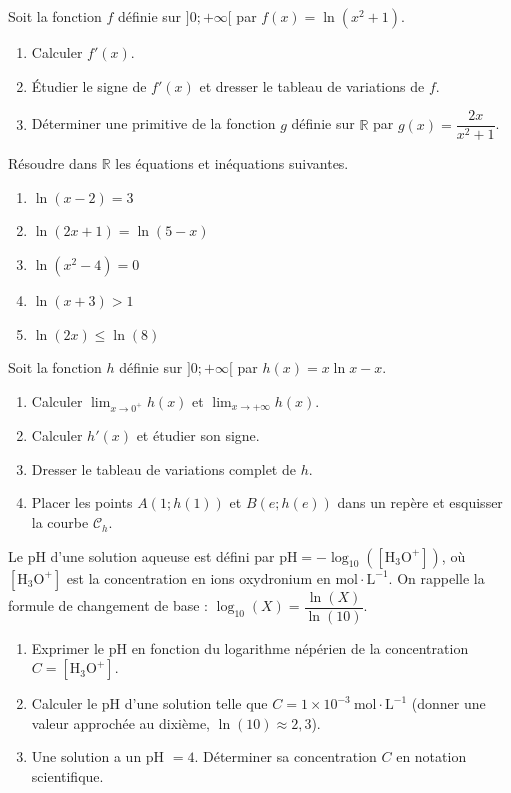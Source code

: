 \documentclass[11pt]{article}
\begin{document}
\begin{exercice}
Soit la fonction $f$ définie sur $]0; +\infty[$ par $f(x) = \ln(x^2 + 1)$.
\begin{enumerate}
    \item Calculer $f'(x)$.
    \item Étudier le signe de $f'(x)$ et dresser le tableau de variations de $f$.
    \item Déterminer une primitive de la fonction $g$ définie sur $\mathbb{R}$ par $g(x) = \dfrac{2x}{x^2+1}$.
\end{enumerate}
\end{exercice}

\begin{exercice}
Résoudre dans $\mathbb{R}$ les équations et inéquations suivantes.
\begin{enumerate}
    \item $\ln(x-2) = 3$
    \item $\ln(2x+1) = \ln(5-x)$
    \item $\ln(x^2 - 4) = 0$
    \item $\ln(x+3) > 1$
    \item $\ln(2x) \leq \ln(8)$
\end{enumerate}
\end{exercice}

\begin{exercice}
Soit la fonction $h$ définie sur $]0; +\infty[$ par $h(x) = x\ln x - x$.
\begin{enumerate}
    \item Calculer $\lim_{x \to 0^+} h(x)$ et $\lim_{x \to +\infty} h(x)$.
    \item Calculer $h'(x)$ et étudier son signe.
    \item Dresser le tableau de variations complet de $h$.
    \item Placer les points $A(1; h(1))$ et $B(e; h(e))$ dans un repère et esquisser la courbe $\mathcal{C}_h$.
\end{enumerate}
\end{exercice}

\begin{exercice}
Le pH d'une solution aqueuse est défini par $\text{pH} = -\log_{10}([\mathrm{H_3O^+}])$, où $[\mathrm{H_3O^+}]$ est la concentration en ions oxydronium en $\text{mol}\cdot\text{L}^{-1}$.
On rappelle la formule de changement de base : $\log_{10}(X) = \dfrac{\ln(X)}{\ln(10)}$.
\begin{enumerate}
    \item Exprimer le pH en fonction du logarithme népérien de la concentration $C = [\mathrm{H_3O^+}]$.
    \item Calculer le pH d'une solution telle que $C = 1 \times 10^{-3}~\text{mol}\cdot\text{L}^{-1}$ (donner une valeur approchée au dixième, $\ln(10) \approx 2,3$).
    \item Une solution a un pH $= 4$. Déterminer sa concentration $C$ en notation scientifique.
\end{enumerate}
\end{exercice}
\end{document}
